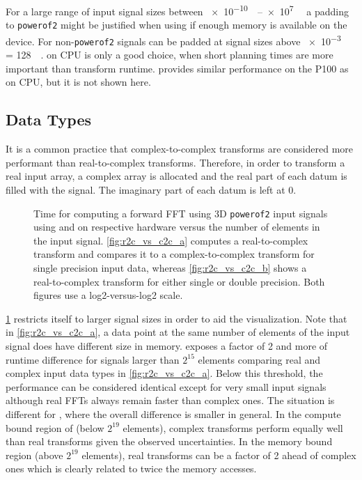 For a large range of input signal sizes between \SIrange[exponent-base=2]{e-10}{e7}{\mebi\byte} a padding to \texttt{powerof2} might be justified when using \cufft{} if enough memory is available on the device. For \fftw{} non-\texttt{powerof2} signals can be padded at signal sizes above \SI[exponent-base=2]{e-3}{\mebi\byte} = \SI{128}{\kibi\byte}. \clfft{} on CPU is only a good choice, when short planning times are more important than transform runtime. \clfft{} provides similar performance on the P100 as on CPU, but it is not shown here.

\subsection{Data Types}
\label{ssec:data_types}

It is a common practice that complex-to-complex transforms are considered more performant than real-to-complex transforms. Therefore, in order to transform a real input array, a complex array is allocated and the real part of each datum is filled with the signal. The imaginary part of each datum is left at $0$.

\begin{figure}[!tbp]
  \centering
  \hfill
  \caption{Time for computing a forward FFT using 3D \texttt{powerof2} input signals using \fftw{} and \cufft{} on respective hardware versus the number of elements in the input signal. \cref{fig:r2c_vs_c2c_a} computes a real-to-complex transform and compares it to a complex-to-complex transform for single precision input data, whereas \cref{fig:r2c_vs_c2c_b} shows a real-to-complex transform for either single or double precision. Both figures use a log2-versus-log2 scale.}
  \label{fig:r2c_vs_c2c}
\end{figure}

\cref{fig:r2c_vs_c2c} restricts itself to larger signal sizes in order to aid the visualization. Note that in \cref{fig:r2c_vs_c2c_a}, a data point at the same number of elements of the input signal does have different size in memory. \fftw{} exposes a factor of 2 and more of runtime difference for signals larger than $2^{15}$ elements comparing real and complex input data types in \cref{fig:r2c_vs_c2c_a}. Below this threshold, the performance can be considered identical except for very small input signals although real FFTs always remain faster than complex ones. The situation is different for \cufft{}, where the overall difference is smaller in general. In the compute bound region of \cufft{} (below $2^{19}$ elements), complex transforms perform equally well than real transforms given the observed uncertainties. In the memory bound region (above $2^{19}$ elements), real transforms can be a factor of 2 ahead of complex ones which is clearly related to twice the memory accesses.    


